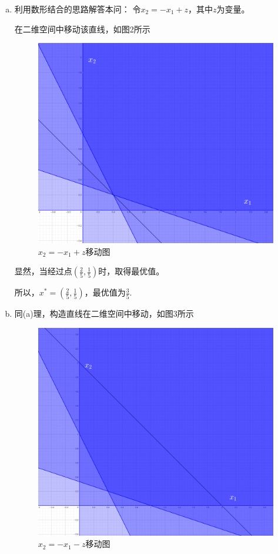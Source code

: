 \documentclass[10pt, a4paper]{article}
\begin{document}
\begin{enumerate}[(a)]
    \item 利用数形结合的思路解答本问：
    令$x_{2}=-x_{1}+z$，其中$z$为变量。
    
    在二维空间中移动该直线，如图2所示
    \begin{figure}[H]
        \centering
        \includegraphics[scale=0.18]{p2.png}
        \caption{$x_{2}=-x_{1}+z$移动图}
    \end{figure}
    显然，当经过点$\left ( \frac{2}{5} ,\frac{1}{5}  \right ) $时，取得最优值。
    
    所以，$x^{*}= \left ( \frac{2}{5} ,\frac{1}{5}  \right ) $，最优值为$\frac{3}{5}$.

    \item 同(a)理，构造直线在二维空间中移动，如图3所示
    \begin{figure}[H]
        \centering
        \includegraphics[scale=0.18]{p3.png}
        \caption{$x_{2}=-x_{1}-z$移动图}
    \end{figure}
    

\end{enumerate}
\end{document}
